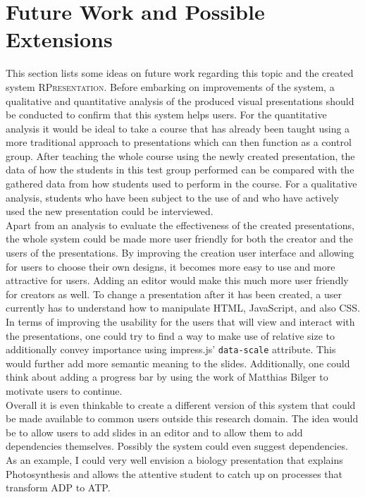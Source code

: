 \documentclass[twoside, 12pt]{article}
\newcommand{\sys}{\textsc{RPresentation}\xspace}
\begin{document}
\section{Future Work and Possible Extensions}

This section lists some ideas on future work regarding this topic and the created system \sys. Before embarking on improvements of the system, a qualitative and quantitative analysis of the produced visual presentations should be conducted to confirm that this system helps users. For the quantitative analysis it would be ideal to take a course that has already been taught using a more traditional approach to presentations which can then function as a control group. After teaching the whole course using the newly created presentation, the data of how the students in this test group performed can be compared with the gathered data from how students used to perform in the course. For a qualitative analysis, students who have been subject to the use of and who have actively used the new presentation could be interviewed.\\

Apart from an analysis to evaluate the effectiveness of the created presentations, the whole system could be made more user friendly for both the creator and the users of the presentations. By improving the creation user interface and allowing for users to choose their own designs, it becomes more easy to use and more attractive for users. Adding an editor would make this much more user friendly for creators as well. To change a presentation after it has been created, a user currently has to understand how to manipulate HTML, JavaScript, and also CSS.\\

In terms of improving the usability for the users that will view and interact with the presentations, one could try to find a way to make use of relative size to additionally convey importance using impress.js' \texttt{data-scale} attribute. This would further add more semantic meaning to the slides. Additionally, one could think about adding a progress bar by using the work of Matthias Bilger \cite{bilger:npentrel15} to motivate users to continue.\\

Overall it is even thinkable to create a different version of this system that could be made available to common users outside this research domain. The idea would be to allow users to add slides in an editor and to allow them to add dependencies themselves. Possibly the system could even suggest dependencies. As an example, I could very well envision a biology presentation that explains Photosynthesis and allows the attentive student to catch up on processes that transform ADP to ATP.\\
\end{document}
